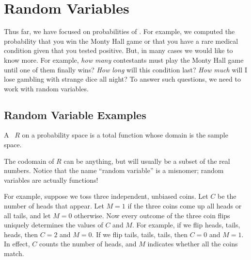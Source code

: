 \chapter{Random Variables}\label{ran_var_chap}


Thus far, we have focused on probabilities of .  For
example, we computed the probability that you win the Monty Hall game
or that you have a rare medical condition given that you tested
positive.  But, in many cases we would like to know more.  For
example, \emph{how many} contestants must play the Monty Hall game
until one of them finally wins?  \emph{How long} will this condition
last?  \emph{How much} will I lose gambling with strange dice all
night?  To answer such questions, we need to work with random
variables.


\section{Random Variable Examples}\label{ran_var_examples_sec}

\begin{definition}
  A ~$R$ on a probability space is a total function
  whose domain is the sample space.
\end{definition}
The codomain of $R$ can be anything, but will usually be a subset of
the real numbers.  Notice that the name ``random variable'' is a
misnomer; random variables are actually functions!

For example, suppose we toss three independent, unbiased coins.  Let
$C$ be the number of heads that appear.  Let $M = 1$ if the three
coins come up all heads or all tails, and let $M = 0$ otherwise.  Now
every outcome of the three coin flips uniquely determines the values
of $C$ and $M$.  For example, if we flip heads, tails, heads, then $C
= 2$ and $M = 0$.  If we flip tails, tails, tails, then $C = 0$ and $M
= 1$.  In effect, $C$ counts the number of heads, and $M$ indicates
whether all the coins match.


